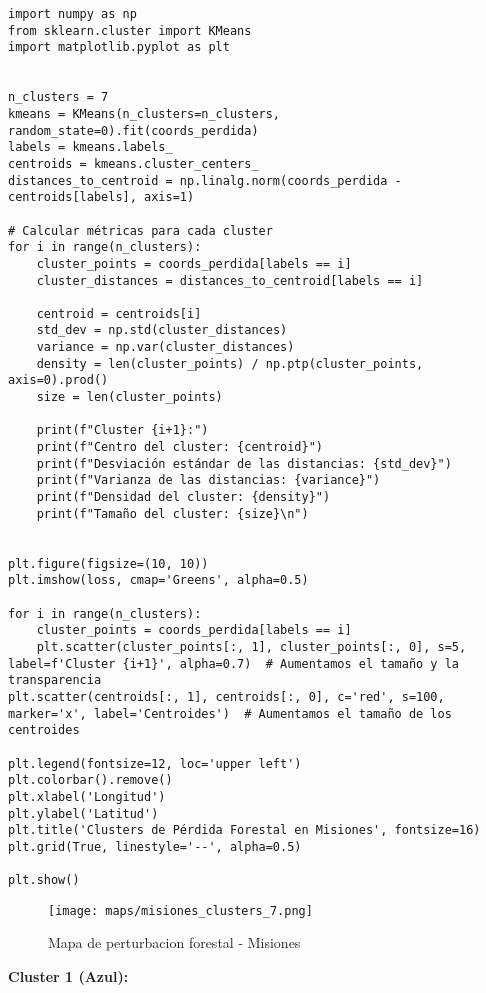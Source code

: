 \documentclass[11pt]{article}
\begin{document}
\begin{verbatim}
import numpy as np
from sklearn.cluster import KMeans
import matplotlib.pyplot as plt


n_clusters = 7
kmeans = KMeans(n_clusters=n_clusters, random_state=0).fit(coords_perdida)
labels = kmeans.labels_
centroids = kmeans.cluster_centers_
distances_to_centroid = np.linalg.norm(coords_perdida - centroids[labels], axis=1)

# Calcular métricas para cada cluster
for i in range(n_clusters):
    cluster_points = coords_perdida[labels == i]
    cluster_distances = distances_to_centroid[labels == i]
    
    centroid = centroids[i]
    std_dev = np.std(cluster_distances)
    variance = np.var(cluster_distances)
    density = len(cluster_points) / np.ptp(cluster_points, axis=0).prod()
    size = len(cluster_points)
    
    print(f"Cluster {i+1}:")
    print(f"Centro del cluster: {centroid}")
    print(f"Desviación estándar de las distancias: {std_dev}")
    print(f"Varianza de las distancias: {variance}")
    print(f"Densidad del cluster: {density}")
    print(f"Tamaño del cluster: {size}\n")


plt.figure(figsize=(10, 10))
plt.imshow(loss, cmap='Greens', alpha=0.5)

for i in range(n_clusters):
    cluster_points = coords_perdida[labels == i]
    plt.scatter(cluster_points[:, 1], cluster_points[:, 0], s=5, label=f'Cluster {i+1}', alpha=0.7)  # Aumentamos el tamaño y la transparencia
plt.scatter(centroids[:, 1], centroids[:, 0], c='red', s=100, marker='x', label='Centroides')  # Aumentamos el tamaño de los centroides

plt.legend(fontsize=12, loc='upper left')
plt.colorbar().remove()
plt.xlabel('Longitud')
plt.ylabel('Latitud')
plt.title('Clusters de Pérdida Forestal en Misiones', fontsize=16)
plt.grid(True, linestyle='--', alpha=0.5)

plt.show()
\end{verbatim}
\begin{figure}[H]
    \centering
        \centering
        \texttt{[image: maps/misiones\_clusters\_7.png]}
        \caption{Mapa de perturbacion forestal - Misiones}
        \label{fig:smog_rating_año}
\end{figure}
\textbf{Cluster 1 (Azul):}
\end{document}
